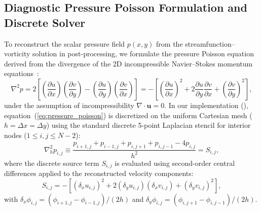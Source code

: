 \documentclass[11pt,a4paper]{article}
\begin{document}
\subsection{Diagnostic Pressure Poisson Formulation and Discrete Solver}
\label{sec:pressure_reconstruction}
To reconstruct the scalar pressure field $p(x, y)$ from the streamfunction--vorticity solution in post-processing, we formulate the pressure Poisson equation derived from the divergence of the 2D incompressible Navier--Stokes momentum equations~\cite{gresho1987solving,quartapelle1993numerical}:
\begin{equation}
    \nabla^2 p = 2 \left[ \left(\frac{\partial u}{\partial x}\right)\left(\frac{\partial v}{\partial y}\right) - \left(\frac{\partial u}{\partial y}\right)\left(\frac{\partial v}{\partial x}\right) \right] = - \left[ \left(\frac{\partial u}{\partial x}\right)^2 + 2\frac{\partial u}{\partial y}\frac{\partial v}{\partial x} + \left(\frac{\partial v}{\partial y}\right)^2 \right], \label{eq:pressure_poisson}
\end{equation}
under the assumption of incompressibility $\nabla \cdot \mathbf{u} = 0$. In our implementation (), equation~(\ref{eq:pressure_poisson}) is discretized on the uniform Cartesian mesh ($h = \Delta x = \Delta y$) using the standard discrete 5-point Laplacian stencil for interior nodes ($1 \le i, j \le N-2$):
\begin{equation}
    \nabla_h^2 p_{i, j} \equiv \frac{p_{i+1, j} + p_{i-1, j} + p_{i, j+1} + p_{i, j-1} - 4 p_{i, j}}{h^2} = S_{i, j},
\end{equation}
where the discrete source term $S_{i, j}$ is evaluated using second-order central differences applied to the reconstructed velocity components:
\begin{equation}
    S_{i, j} = - \left[ \left(\delta_x u_{i, j}\right)^2 + 2 (\delta_y u_{i, j}) (\delta_x v_{i, j}) + \left(\delta_y v_{i, j}\right)^2 \right],
\end{equation}
with $\delta_x \phi_{i, j} = (\phi_{i+1, j} - \phi_{i-1, j})/(2h)$ and $\delta_y \phi_{i, j} = (\phi_{i, j+1} - \phi_{i, j-1})/(2h)$.
\end{document}
